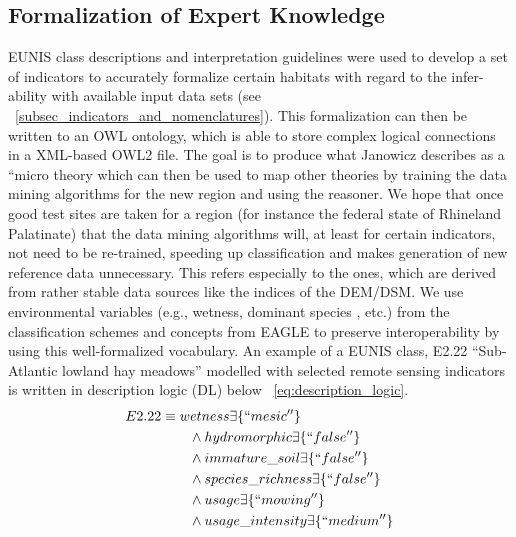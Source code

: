 \documentclass[authoryear, review,12pt,number]{elsarticle}
\begin{document}
\subsection{Formalization of Expert Knowledge}
EUNIS class descriptions and interpretation guidelines \citep{EUNISManual} were
used to develop a set of indicators to accurately formalize certain habitats
with regard to the infer-ability with available input data sets (see
~\ref{subsec_indicators_and_nomenclatures}). This formalization can then be
written to an OWL ontology, which is able to store complex logical connections
in a XML-based OWL2 file. The goal is to produce what Janowicz describes
as a ``micro theory \citep{Janowicz2012} which can then be used to map other
theories by training the data mining algorithms for the new
region and using the reasoner. We hope that once good test sites are taken for 
a region (for instance the federal state of Rhineland Palatinate) that the data 
mining algorithms will, at least for certain indicators, not need to be
re-trained, speeding up classification and makes generation of new reference
data unnecessary. This refers especially to the ones, which are derived from
rather stable data sources like the indices of the DEM/DSM\@. We use environmental
variables (e.g., wetness, dominant species%
, etc.) from the classification schemes and concepts from EAGLE %
to preserve interoperability by using this well-formalized
vocabulary.
 An example of a EUNIS class, E2.22
``Sub-Atlantic lowland hay meadows'' modelled with selected remote sensing
indicators is written in description logic (DL) below
~\ref{eq:description_logic}.
\begin{equation}
\begin{align*}
E2.22 &\equiv wetness \exists \{``mesic''\} \\
&\qquad {} \land hydromorphic \exists \{``false''\} \\
&\qquad {} \land immature\_soil \exists \{``false''\} \\
&\qquad {} \land species\_richness \exists \{``false''\} \\
&\qquad {} \land usage \exists \{``mowing''\} \\
&\qquad {} \land usage\_intensity \exists \{``medium''\} \\
\end{align*}
\label{eq:description_logic}
\end{equation}
\end{document}
